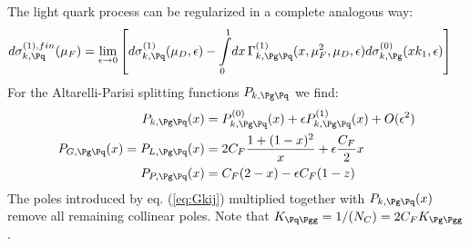 The light quark process can be regularized in a complete analogous way:
\begin{align}
d\sigma_{k,\Pq}^{(1),fin}(\mu_F) &= \lim_{\epsilon\rightarrow 0}\left[d\sigma_{k,\Pq}^{(1)}(\mu_D,\epsilon)-\int\limits_0^1\!dx\,\Gamma_{k,\Pg\Pq}^{(1)}(x,\mu_F^2,\mu_D,\epsilon)d\sigma_{k,\Pg}^{(0)}(xk_1,\epsilon)\right] \label{eq:qMassFact}
\end{align}
For the Altarelli-Parisi splitting functions $P_{k,\Pg\Pq}$ we find\cite{Altarelli:1977zs,Vogelsang:1995vh,epub29831}:
\begin{align}
P_{k,\Pg\Pq}(x) &= P_{k,\Pg\Pq}^{(0)}(x) + \epsilon P_{k,\Pg\Pq}^{(1)}(x) + O(\epsilon^2)\\
P_{G,\Pg\Pq}(x) = P_{L,\Pg\Pq}(x) &= 2C_F\frac{1+(1-x)^2}{x} + \epsilon \frac {C_F} 2 x\\
P_{P,\Pg\Pq}(x) &= C_F(2-x) - \epsilon C_F(1-z)
\end{align}
The poles introduced by eq. (\ref{eq:Gkij}) multiplied together with $P_{k,\Pg\Pq}(x)$ remove all remaining collinear poles. Note that $K_{\Pq\Pgg} = 1/(N_C) = 2C_FK_{\Pg\Pgg}$. 

